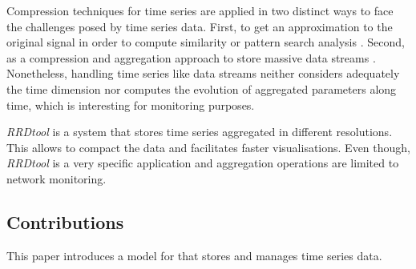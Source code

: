 Compression techniques for time series are applied in two distinct
ways to face the challenges posed by time series data. First, to get
an approximation to the original signal in order to compute similarity
or pattern search analysis \cite{fu11,keogh01,last01}. Second, as a
compression and aggregation approach to store massive data streams
\cite{cormode08:pods,bonnet01}.
%
Nonetheless, handling time series like data streams neither considers
adequately the time dimension nor computes the evolution of aggregated
parameters along time, which is interesting for monitoring purposes.

\emph{RRDtool} \cite{rrdtool} is a system that stores time series
aggregated in different resolutions. This allows to compact the data
and facilitates faster visualisations.
%
Even though, \emph{RRDtool} is a very specific application and
aggregation operations are limited to network monitoring.




\subsection{Contributions}


This paper introduces a model for  that stores and manages
time series data.

